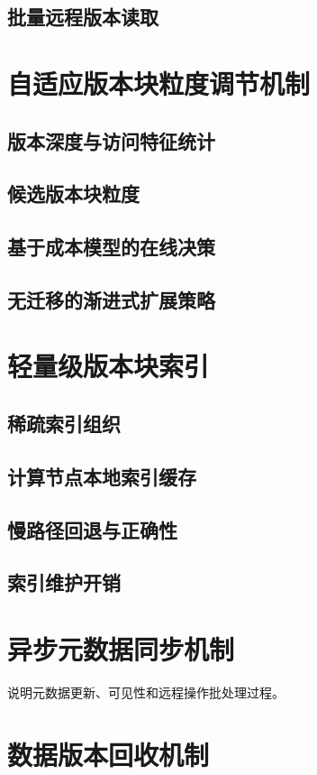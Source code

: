\subsection{批量远程版本读取}

\section{自适应版本块粒度调节机制}
\subsection{版本深度与访问特征统计}
\subsection{候选版本块粒度}
\subsection{基于成本模型的在线决策}
\subsection{无迁移的渐进式扩展策略}

\section{轻量级版本块索引}
\subsection{稀疏索引组织}
\subsection{计算节点本地索引缓存}
\subsection{慢路径回退与正确性}
\subsection{索引维护开销}

\section{异步元数据同步机制}
说明元数据更新、可见性和远程操作批处理过程。
\section{数据版本回收机制}
